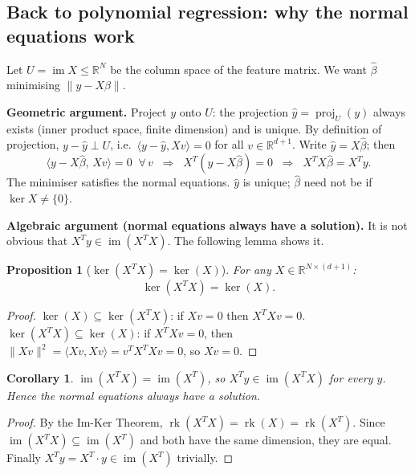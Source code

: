 \documentclass[11pt]{article}
\theoremstyle{definition}
\theoremstyle{plain}
\newtheorem{proposition}{Proposition}[section]
\newtheorem{corollary}{Corollary}[section]
\begin{document}
\subsection{Back to polynomial regression: why the normal equations work}

Let $U = \operatorname{im}X \leq \mathbb{R}^N$ be the column space of the
feature matrix.  We want $\hat\beta$ minimising $\|y - X\beta\|$.

\medskip\noindent
\textbf{Geometric argument.}
Project $y$ onto $U$: the projection $\hat{y} = \operatorname{proj}_U(y)$
always exists (inner product space, finite dimension) and is unique.
By definition of projection, $y - \hat{y} \perp U$, i.e.\
$\langle y - \hat{y}, Xv\rangle = 0$ for all $v\in\mathbb{R}^{d+1}$.
Write $\hat{y} = X\hat\beta$; then
\[
  \langle y - X\hat\beta,\, Xv\rangle = 0
  \;\;\forall\, v
  \;\;\Longrightarrow\;\;
  X^T(y - X\hat\beta) = 0
  \;\;\Longrightarrow\;\;
  X^TX\hat\beta = X^Ty.
\]
The minimiser satisfies the normal equations.  $\hat{y}$ is unique;
$\hat\beta$ need not be if $\ker X \neq \{0\}$.

\medskip\noindent
\textbf{Algebraic argument (normal equations always have a solution).}
It is not obvious that $X^Ty \in \operatorname{im}(X^TX)$.  The following
lemma shows it.

\begin{proposition}[$\ker(X^TX) = \ker(X)$]
  For any $X \in \mathbb{R}^{N\times(d+1)}$:
  \[
    \ker(X^TX) = \ker(X).
  \]
\end{proposition}
\begin{proof}
  $\ker(X) \subseteq \ker(X^TX)$: if $Xv = 0$ then $X^TXv = 0$. \\
  $\ker(X^TX) \subseteq \ker(X)$: if $X^TXv = 0$, then
  $\|Xv\|^2 = \langle Xv, Xv\rangle = v^TX^TXv = 0$,
  so $Xv = 0$.
\end{proof}

\begin{corollary}
  $\operatorname{im}(X^TX) = \operatorname{im}(X^T)$, so
  $X^Ty \in \operatorname{im}(X^TX)$ for every $y$.
  Hence the normal equations always have a solution.
\end{corollary}
\begin{proof}
  By the Im-Ker Theorem,
  $\operatorname{rk}(X^TX) = \operatorname{rk}(X) = \operatorname{rk}(X^T)$.
  Since $\operatorname{im}(X^TX) \subseteq \operatorname{im}(X^T)$ and both
  have the same dimension, they are equal.
  Finally $X^Ty = X^T \cdot y \in \operatorname{im}(X^T)$ trivially.
\end{proof}
\end{document}

